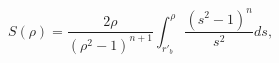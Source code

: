 \begin{equation}
S(\rho)=\frac{2\rho}{(\rho^{2}-1)^{n+1}} \int
^{\rho}_{r'_{b}}\frac{(s^{2}-1)^{n}}{s^{2}}ds \label{ratio1},
\end{equation}

